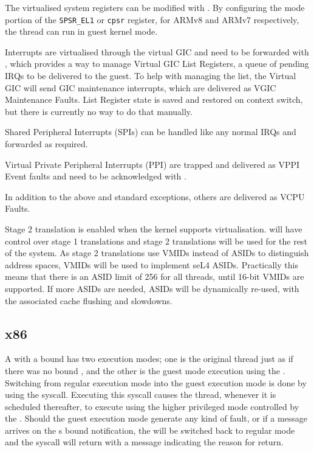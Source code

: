 The virtualised system registers can be modified with .
By configuring the mode portion of the \texttt{SPSR\_EL1} or \texttt{cpsr} register,
for ARMv8 and ARMv7 respectively, the thread can run in guest kernel mode.

Interrupts are virtualised through the virtual GIC and need to be forwarded with
, which provides a way to manage
Virtual GIC List Registers, a queue of pending IRQs to be delivered to the guest. To help
with managing the list, the Virtual GIC will send GIC maintenance interrupts, which are
delivered as VGIC Maintenance Faults. List Register state is saved and restored on 
context switch, but there is currently no way to do that manually.

Shared Peripheral Interrupts (SPIs) can be handled like any normal IRQs and forwarded as required.

Virtual Private Peripheral Interrupts (PPI) are trapped and delivered as VPPI Event faults and need
to be acknowledged with .

In addition to the above and standard exceptions, others are delivered as VCPU Faults.

Stage 2 translation is enabled when the kernel supports virtualisation.  will have control
over stage 1 translations and stage 2 translations will be used for the rest of the system.
As stage 2 translations use VMIDs instead of ASIDs to distinguish address spaces, VMIDs will be used
to implement seL4 ASIDs. Practically this means that there is an ASID limit of 256 for all threads,
until 16-bit VMIDs are supported. If more ASIDs are needed, ASIDs will be dynamically re-used, with
the associated cache flushing and slowdowns.

\subsection{x86}

A  with a bound  has two execution modes; one is the original thread just as
if there was no bound , and the other is the guest mode execution using the
. Switching from regular execution mode into the guest execution mode is
done by using the  syscall. Executing this syscall causes the thread, whenever
it is scheduled thereafter, to execute using the higher privileged mode controlled by the .
Should the guest execution mode generate any kind of fault, or if a message arrives
on the s bound notification, the  will be switched back to regular mode
and the  syscall will return with a message indicating the reason for return.

